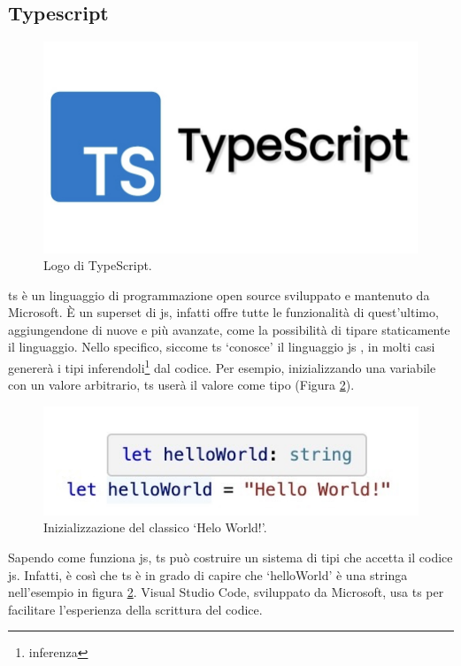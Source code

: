 \subsection{Typescript}\label{sec:Typescript}
\begin{figure}[H]
\centering
\includegraphics[width=.7\textwidth]{Images/ts.png}
\caption{\label{fig:logo ts}Logo di TypeScript.}
\end{figure}
\acrfull{ts} \cite{typescript} è un linguaggio di programmazione \gls{open source} sviluppato e mantenuto da Microsoft. È un superset di \acrlong{js}, infatti offre tutte le funzionalità di quest'ultimo, aggiungendone di nuove e più avanzate, come la possibilità di tipare staticamente il linguaggio. Nello specifico, siccome \acrlong{ts} `conosce' il linguaggio \acrlong{js} \cite{articleTS}, in molti casi genererà i tipi inferendoli\footnote{\glsdesc{inferenza}} dal codice. Per esempio, inizializzando una variabile con un valore arbitrario, \acrlong{ts} userà il valore come tipo (Figura \ref{fig:hello}). 

\begin{figure}[H]
\centering
\includegraphics[width=.8\textwidth]{Images/ts hello.jpg}
\caption{\label{fig:hello}Inizializzazione del classico `Helo World!'.}
\end{figure}

Sapendo come funziona \acrlong{js}, \acrlong{ts} può costruire un sistema di tipi che accetta il codice \acrlong{js}. Infatti, è così che \acrlong{ts} è in grado di capire che `helloWorld' è una stringa nell'esempio in figura \ref{fig:hello}.
Visual Studio Code, sviluppato da Microsoft, usa \acrlong{ts} per facilitare l'esperienza della scrittura del codice. 

